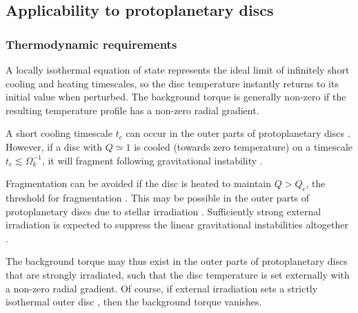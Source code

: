 {\bf
  \subsection{Applicability to protoplanetary discs}
  
  \subsubsection{Thermodynamic requirements}  

  A locally isothermal equation of state represents the ideal limit
  of infinitely short cooling and heating timescales, so the 
  disc temperature instantly returns to its initial value when 
  perturbed. The background torque is generally non-zero if the 
  resulting temperature profile has a non-zero radial gradient.  
  
  A short cooling timescale $t_c$ can occur in the outer
  parts of protoplanetary discs 
  \citep{rafikov05,clarke09,rice09,cossins10b}.  %
  However, if a disc with $Q\simeq 1$ is cooled (towards zero
  temperature) on a timescale $t_c\lesssim\Omega_k^{-1}$, it will
  fragment following gravitational instability
  \citep{gammie01,rice05,paardekooper12}.  
  
  Fragmentation can be avoided if the disc is heated to maintain 
  $Q>Q_c$, the threshold for fragmentation \citep[$Q_c\simeq
  1.4$ for isothermal discs,][]{mayer04}. This may be 
  possible in the outer parts of protoplanetary discs due to
  stellar irradiation \citep{rafikov09,zhu12}. Sufficiently strong
  external irradiation is expected to suppress the linear gravitational
  instabilities altogether \citep{rice11}.  

  The background torque may thus exist in the outer
  parts of protoplanetary discs that are strongly irradiated, such
  that the disc temperature is set externally with a non-zero radial
  gradient. Of course, if external irradiation sets a strictly
  isothermal outer disc \citep[e.g.][]{boley09}, then the background
  torque vanishes.      

}
